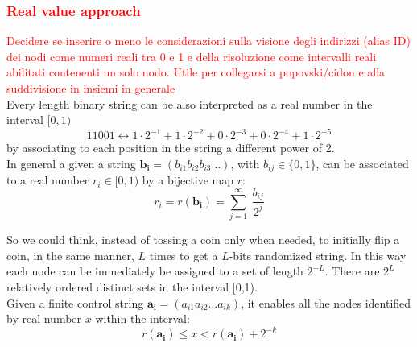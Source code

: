 \documentclass[12pt,a4paper,twocolumns]{report}
\begin{document}
\subsubsection{\textcolor{red}{Real value approach}}
\label{realvalueapproach}
\textcolor{red}{Decidere se inserire o meno le considerazioni sulla visione degli indirizzi (alias ID) dei nodi come numeri reali tra 0 e 1 e della risoluzione come intervalli reali abilitati contenenti un solo nodo. Utile per collegarsi a popovski/cidon e alla suddivisione in insiemi in generale}\\
Every length binary string can be also interpreted as a real number in the interval $[0,1)$
\begin{equation*}
11001 \leftrightarrow 1 \cdot 2^{-1} + 1 \cdot 2^{-2} + 0 \cdot 2^{-3} + 0 \cdot 2^{-4} +1 \cdot 2^{-5} 
\end{equation*}
by associating to each position in the string a different power of 2.\\
In general a given a string $\mathbf{b_{i}}=(b_{i1}b_{i2}b_{i3}\ldots)$, with $b_{ij} \in \{0,1\}$, can be associated to a real number $r_{i} \in [0,1)$ by a bijective map $r$:\\

\begin{equation}
r_{i}=r(\mathbf{b_{i}})=\sum_{j=1}^{\infty} \ \frac{b_{ij}}{2^{j}}
\end{equation}

So we could think, instead of tossing a coin only when needed, to initially flip a coin, in the same manner, $L$ times to get a $L$-bits randomized string.
In this way each node can be immediately be assigned to a set of length $2^{-L}$. There are $2^{L}$ relatively ordered distinct sets in the interval [0,1).\\
Given a finite control string $\mathbf{a_{i}}=(a_{i1}a_{i2}\ldots a_{ik})$, it enables all the nodes identified by real number $x$ within the interval:
\begin{equation}
	r(\mathbf{a_{i}})\leq x <r(\mathbf{a_{i}})+2^{-k}
\end{equation}
\end{document}
